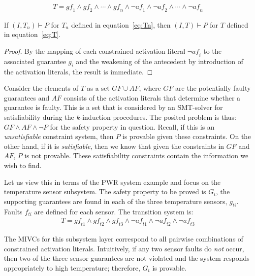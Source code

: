 \begin{gather}
T = \mathit{gf}_1 \land \mathit{gf}_2 \land \cdots \land \mathit{gf}_n \land \neg \mathit{af}_1 \land \neg \mathit{af}_2 \land \cdots \land \neg \mathit{af}_n
\label{eq:T}
\end{gather}

\begin{theorem} If $(I,T_n) \vdash P$ for $T_n$ defined in equation~\ref{eq:Tn}, then $(I,T) \vdash P$ for $T$ defined in equation~\ref{eq:T}.
\begin{proof}
By the mapping of each constrained activation literal $\neg \mathit{af}_i$ to the associated guarantee $g_i$ and the weakening of the antecedent by introduction of the activation literals, the result is immediate.
\end{proof}
\end{theorem}

Consider the elements of $T$ as a set $GF \cup AF$, where $GF$ are the potentially faulty guarantees and $AF$ consists of the activation literals that determine whether a guarantee is faulty. This is a set that is considered by an SMT-solver for satisfiability during the $k$-induction procedures. The posited problem is thus: $GF \land AF \land \neg P$ for the safety property in question. Recall, if this is an \emph{unsatisfiable} constraint system, then $P$ is provable given these constraints. On the other hand, if it is \emph{satisfiable}, then we know that given the constraints in $GF$ and $AF$, $P$ is not provable. These satisfiability constraints contain the information we wish to find. 

Let us view this in terms of the PWR system example and focus on the temperature sensor subsystem. The safety property to be proved is $G_t$, the supporting guarantees are found in each of the three temperature sensors, $g_{ti}$. Faults $f_{ti}$ are defined for each sensor. The transition system is: 
\begin{gather*}
T = \mathit{gf}_{t1} \land \mathit{gf}_{t2} \land \mathit{gf}_{t3}  \land \neg \mathit{af}_{t1} \land \neg \mathit{af}_{t2} \land \neg \mathit{af}_{t3}
\end{gather*}

The MIVCs for this subsystem layer correspond to all pairwise combinations of constrained activation literals. Intuitively, if any two sensor faults do {\em not} occur, then two of the three sensor guarantees are not violated and the system responds appropriately to high temperature; therefore, $G_t$ is provable. 

